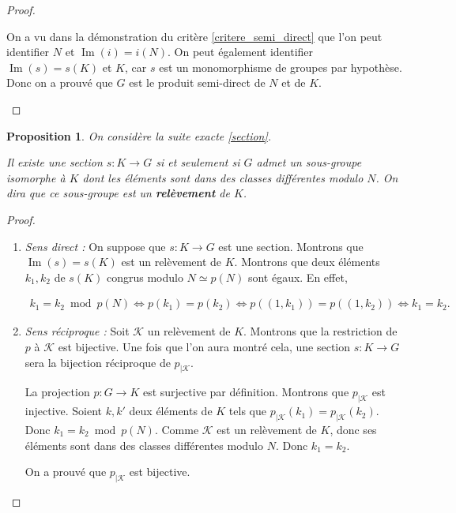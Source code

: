 \documentclass[french]{report}
\newtheorem{prop}{Proposition}[section]
\begin{document}
\begin{proof}
\begin{enumerate}
    On a vu dans la démonstration du critère \ref{critere_semi_direct} que l'on peut identifier $N$ et $\operatorname{Im}(i) = i(N)$. On peut également identifier $\operatorname{Im}(s) = s(K)$ et $K$, car $s$ est un monomorphisme de groupes par hypothèse. Donc on a prouvé que $G$ est le produit semi-direct de $N$ et de $K$.
  \end{enumerate}
\end{proof}

\begin{prop}
  On considère la suite exacte \ref{section}.

  Il existe une section $s : K \to G$ si et seulement si $G$ admet un sous-groupe isomorphe à $K$ dont les éléments sont dans des classes différentes modulo $N$. On dira que ce sous-groupe est un \textbf{relèvement} de $K$.
\end{prop}

\begin{proof}
  \

  \begin{enumerate}
    \item \emph{Sens direct :} On suppose que $s : K \to G$ est une section. Montrons que $\operatorname{Im}(s) = s(K)$ est un relèvement de $K$. Montrons que deux éléments $k_1,k_2$ de $s(K)$ congrus modulo $N \simeq p(N)$ sont égaux. En effet,

    \begin{gather*}
      k_1 = k_2 \ \operatorname{mod} \ p(N) \iff p(k_1) = p(k_2) \iff p((1,k_1)) = p((1,k_2)) \iff k_1 = k_2.
    \end{gather*}

    \item \emph{Sens réciproque :} Soit $\mathcal{K}$ un relèvement de $K$. Montrons que la restriction de $p$ à $\mathcal{K}$ est bijective. Une fois que l'on aura montré cela, une section $s : K \to G$ sera la bijection réciproque de $p _{\mid \mathcal{K}}$.

    La projection $p : G \to K$ est surjective par définition. Montrons que $p _{\mid \mathcal{K}}$ est injective. Soient $k,k'$ deux éléments de $K$ tels que $p _{\mid \mathcal{K}}(k_1) =p _{\mid \mathcal{K}}(k_2)$. Donc $k_1 = k_2 \ \operatorname{mod} \ p(N)$. Comme $\mathcal{K}$ est un relèvement de $K$, donc ses éléments sont dans des classes différentes modulo $N$. Donc $k_1= k_2$.

    On a prouvé que $p _{\mid \mathcal{K}}$ est bijective.
  \end{enumerate}
\end{proof}
\end{document}
